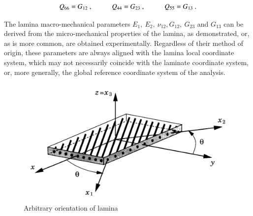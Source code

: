 \begin{equation} 
Q_{66} = G_{12}\ ,
\hspace{10mm}
Q_{44} = G_{23}\ ,
\hspace{10mm}
Q_{55} = G_{13}
\label{eqscomp10}\ .
\end{equation}

The lamina macro-mechanical parameters $E_1,\ E_2,\ \nu_{12}, G_{12},\ G_{23}$ and $G_{13}$ can be derived from the micro-mechanical properties of the lamina, as demonstrated, or, as is more common, are obtained experimentally. Regardless of their method of origin, these parameters are always aligned with the lamina local coordinate system, which may not necessarily coincide with the laminate coordinate system, or, more generally, the global reference coordinate system of the analysis.

\begin{figure}[h!]
	\centering
	\includegraphics[width=12cm]{images/composite_lamina_orientation}
	\caption{Arbitrary orientation of lamina \cite{reddy2004mechanics}}
	\label{fig:compositelaminaorientation}
\end{figure}

